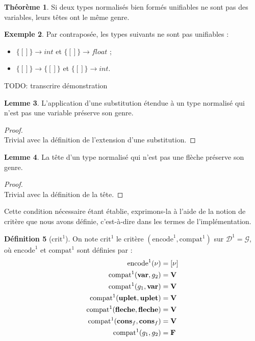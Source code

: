 \documentclass[a4paper]{report}
\newenvironment{preuve} 
	{\begin{proof}~\\} 
	{\end{proof}}
\theoremstyle{definition}
\newtheorem{theoreme}{Théorème}
\newtheorem{definition}[theoreme]{Définition}
\newtheorem{lemme}[theoreme]{Lemme}
\newtheorem{exemple}[theoreme]{Exemple}
\newcommand{\mset}[1]{\{\![#1]\!\}}
\newcommand{\G}{\mathscr{G}}
\begin{document}
\begin{theoreme}
	Si deux types normalisés bien formés unifiables ne sont pas des variables, leurs têtes ont le même genre.
\end{theoreme}

\begin{exemple}
	Par contraposée, les types suivants ne sont pas unifiables :
	\begin{itemize}
		\item $\mset{} \rightarrow int$ et $\mset{} \rightarrow float$ ;
		\item $\mset{} \rightarrow \mset{}$ et $\mset{} \rightarrow int$.
	\end{itemize}
\end{exemple}

TODO: transcrire démonstration

\begin{lemme} \label{non_var_implique_subst_preserve_genre}
	L'application d'une substitution étendue à un type normalisé qui n'est pas une variable préserve son genre.
\end{lemme}

\begin{preuve}
	Trivial avec la définition de l'extension d'une substitution.
\end{preuve}

\begin{lemme} \label{non_fleche_implique_tete_preserve_genre}
	La tête d'un type normalisé qui n'est pas une flèche préserve son genre.
\end{lemme}

\begin{preuve}
	Trivial avec la définition de la tête.
\end{preuve}

Cette condition nécessaire étant établie, exprimons-la à l'aide de la notion de critère que nous avons définie, c'est-à-dire dans les termes de l'implémentation.

\begin{definition}[$\mathrm{crit}^1$]
	On note $\mathrm{crit}^1$ le critère $(\mathrm{encode}^1, \mathrm{compat}^1)$ sur $\mathscr{D}^1 = \G$, où $\mathrm{encode}^1$ et $\mathrm{compat}^1$ sont définies par :
	\begin{align*}
			\mathrm{encode}^1 (\nu) &=
			[ \nu ]
		\\
			\mathrm{compat}^1 (\bold{var}, {g}_2) &=
			\bold{V}
		\\
			\mathrm{compat}^1 ({g}_1, \bold{var}) &=
			\bold{V}
		\\
			\mathrm{compat}^1 (\bold{uplet}, \bold{uplet}) &=
			\bold{V}
		\\
			\mathrm{compat}^1 (\bold{fleche}, \bold{fleche}) &=
			\bold{V}
		\\
			\mathrm{compat}^1 (\bold{cons}_f, \bold{cons}_f) &=
			\bold{V}
		\\
			\mathrm{compat}^1 ({g}_1, {g}_2) &=
			\bold{F}
	\end{align*}
\end{definition}
\end{document}
